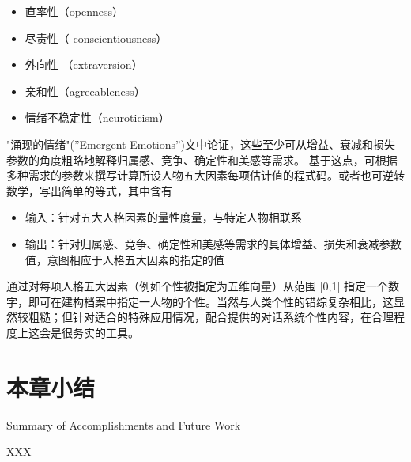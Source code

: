 \begin{itemize}
\item 直率性（openness）
\item 尽责性（ conscientiousness）
\item 外向性 （extraversion）
\item 亲和性（agreeableness）
\item 情绪不稳定性（neuroticism）
\end{itemize}

"涌现的情绪"(”Emergent Emotions”)文中论证，这些至少可从增益、衰减和损失参数的角度粗略地解释归属感、竞争、确定性和美感等需求。 
基于这点，可根据多种需求的参数来撰写计算所设人物五大因素每项估计值的程式码。或者也可逆转数学，写出简单的等式，其中含有

\begin{itemize}
\item 输入：针对五大人格因素的量性度量，与特定人物相联系 
\item 输出：针对归属感、竞争、确定性和美感等需求的具体增益、损失和衰减参数值，意图相应于人格五大因素的指定的值
\end{itemize}

通过对每项人格五大因素（例如个性被指定为五维向量）从范围 [0,1] 指定一个数字，即可在建构档案中指定一人物的个性。当然与人类个性的错综复杂相比，这显然较粗糙；但针对适合的特殊应用情况，配合提供的对话系统个性内容，在合理程度上这会是很务实的工具。

\section{本章小结}{Summary of Accomplishments and Future Work}

XXX
